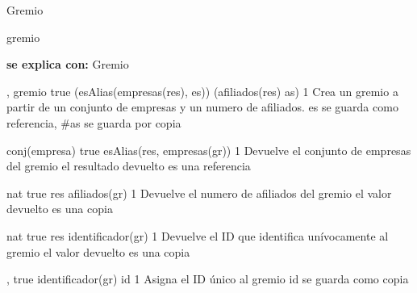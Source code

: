 \begin{interfaz}{Gremio}

\begin{iparamformales}{gremio}

\textbf{\large se explica con:} Gremio

\end{iparamformales}

{, }{gremio}
{true}
{(esAlias(empresas(res), es)) \land (afiliados(res) \igobs as)}
{1}
{Crea un gremio a partir de un conjunto de empresas y un numero de afiliados.}
{es se guarda como referencia, \#as se guarda por copia}

{}{conj(empresa)}
{true}
{esAlias(res, empresas(gr))}
{1}
{Devuelve el conjunto de empresas del gremio}
{el resultado devuelto es una referencia}

{}{nat}
{true}
{res \igobs afiliados(gr)}
{1}
{Devuelve el numero de afiliados del gremio}
{el valor devuelto es una copia}

{}{nat}
{true}
{res \igobs identificador(gr)}
{1}
{Devuelve el ID que identifica un\'ivocamente al gremio}
{el valor devuelto es una copia}

{, }{}
{true}
{identificador(gr) \igobs id}
{1}
{Asigna el ID \'unico al gremio}
{id se guarda como copia}

\end{interfaz}